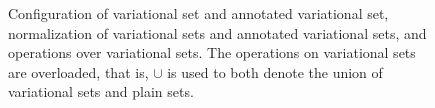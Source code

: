 \begin{figure}
%
%
%


\caption{Configuration of variational set and annotated variational set, normalization of variational sets and annotated variational sets, and operations over variational sets. The operations on variational sets
are overloaded, that is, $\cup$ is used to both denote the union of variational sets and plain sets.
}
\label{fig:vset}
\end{figure}


